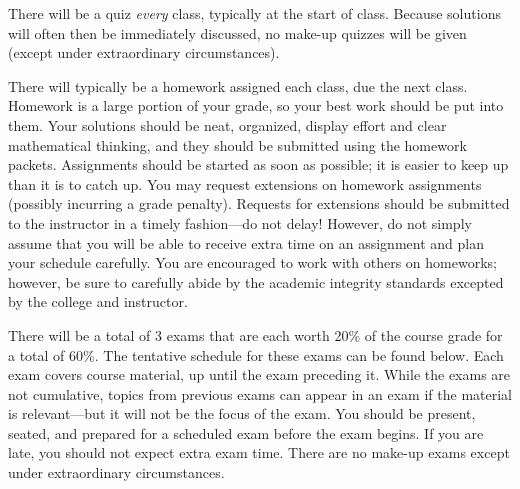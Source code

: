 \documentclass[11pt,letterpaper]{article}
\begin{document}
There will be a quiz \textit{every} class, typically at the start of class. Because solutions will often then be immediately discussed, no make-up quizzes will be given (except under extraordinary circumstances). \pspace


There will typically be a homework assigned each class, due the next class. Homework is a large portion of your grade, so your best work should be put into them. Your solutions should be neat, organized, display effort and clear mathematical thinking, and they should be submitted using the homework packets. Assignments should be started as soon as possible; it is easier to keep up than it is to catch up. You may request extensions on homework assignments (possibly incurring a grade penalty). Requests for extensions should be submitted to the instructor in a timely fashion---do not delay! However, do not simply assume that you will be able to receive extra time on an assignment and plan your schedule carefully. You are encouraged to work with others on homeworks; however, be sure to carefully abide by the academic integrity standards excepted by the college and instructor. \pspace



\newpage



There will be a total of 3 exams that are each worth 20\% of the course grade for a total of 60\%. The tentative schedule for these exams can be found below. Each exam covers course material, up until the exam preceding it. While the exams are not cumulative, topics from previous exams can appear in an exam if the material is relevant---but it will not be the focus of the exam. You should be present, seated, and prepared for a scheduled exam before the exam begins. If you are late, you should not expect extra exam time. There are no make-up exams except under extraordinary circumstances. \pspace
\end{document}
